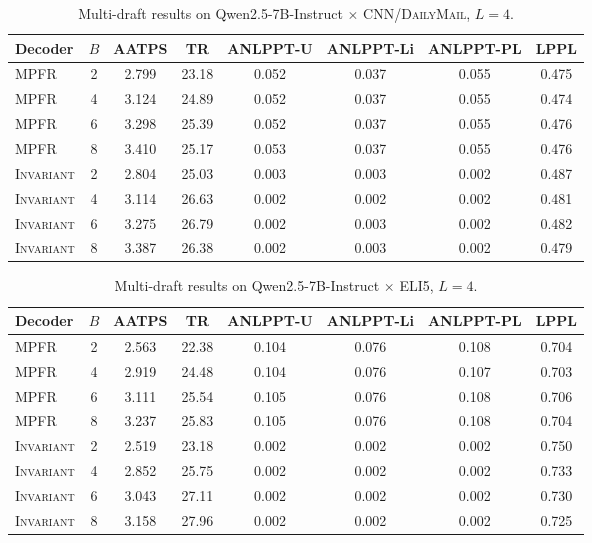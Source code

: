 \begin{table}[h]
\centering
\small
\caption{Multi-draft results on Qwen2.5-7B-Instruct $\times$
\textsc{CNN/DailyMail}, $L{=}4$.}
\label{tab:full-qwen-cnn}
\begin{tabular}{l c c c c c c c}
\toprule
Decoder & $B$ & AATPS & TR & ANLPPT-U & ANLPPT-Li & ANLPPT-PL & LPPL \\
\midrule
\textsc{MPFR}      & 2 & 2.799 & 23.18 & 0.052 & 0.037 & 0.055 & 0.475 \\
\textsc{MPFR}      & 4 & 3.124 & 24.89 & 0.052 & 0.037 & 0.055 & 0.474 \\
\textsc{MPFR}      & 6 & 3.298 & 25.39 & 0.052 & 0.037 & 0.055 & 0.476 \\
\textsc{MPFR}      & 8 & 3.410 & 25.17 & 0.053 & 0.037 & 0.055 & 0.476 \\
\textsc{Invariant} & 2 & 2.804 & 25.03 & 0.003 & 0.003 & 0.002 & 0.487 \\
\textsc{Invariant} & 4 & 3.114 & 26.63 & 0.002 & 0.002 & 0.002 & 0.481 \\
\textsc{Invariant} & 6 & 3.275 & 26.79 & 0.002 & 0.003 & 0.002 & 0.482 \\
\textsc{Invariant} & 8 & 3.387 & 26.38 & 0.002 & 0.003 & 0.002 & 0.479 \\
\bottomrule
\end{tabular}
\end{table}

\begin{table}[h]
\centering
\small
\caption{Multi-draft results on Qwen2.5-7B-Instruct $\times$ \textsc{ELI5},
$L{=}4$.}
\label{tab:full-qwen-eli5}
\begin{tabular}{l c c c c c c c}
\toprule
Decoder & $B$ & AATPS & TR & ANLPPT-U & ANLPPT-Li & ANLPPT-PL & LPPL \\
\midrule
\textsc{MPFR}      & 2 & 2.563 & 22.38 & 0.104 & 0.076 & 0.108 & 0.704 \\
\textsc{MPFR}      & 4 & 2.919 & 24.48 & 0.104 & 0.076 & 0.107 & 0.703 \\
\textsc{MPFR}      & 6 & 3.111 & 25.54 & 0.105 & 0.076 & 0.108 & 0.706 \\
\textsc{MPFR}      & 8 & 3.237 & 25.83 & 0.105 & 0.076 & 0.108 & 0.704 \\
\textsc{Invariant} & 2 & 2.519 & 23.18 & 0.002 & 0.002 & 0.002 & 0.750 \\
\textsc{Invariant} & 4 & 2.852 & 25.75 & 0.002 & 0.002 & 0.002 & 0.733 \\
\textsc{Invariant} & 6 & 3.043 & 27.11 & 0.002 & 0.002 & 0.002 & 0.730 \\
\textsc{Invariant} & 8 & 3.158 & 27.96 & 0.002 & 0.002 & 0.002 & 0.725 \\
\bottomrule
\end{tabular}
\end{table}

